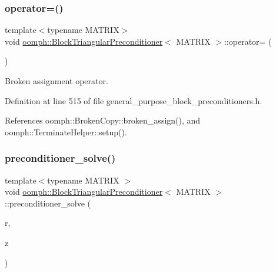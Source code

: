 \subsubsection{\texorpdfstring{operator=()}{operator=()}}
{\footnotesize\ttfamily template$<$typename M\+A\+T\+R\+IX$>$ \\
void \hyperlink{classoomph_1_1BlockTriangularPreconditioner}{oomph\+::\+Block\+Triangular\+Preconditioner}$<$ M\+A\+T\+R\+IX $>$\+::operator= (\begin{DoxyParamCaption}\item[{const \hyperlink{classoomph_1_1BlockTriangularPreconditioner}{Block\+Triangular\+Preconditioner}$<$ M\+A\+T\+R\+IX $>$ \&}]{ }\end{DoxyParamCaption})\hspace{0.3cm}{\ttfamily [inline]}}



Broken assignment operator. 



Definition at line 515 of file general\+\_\+purpose\+\_\+block\+\_\+preconditioners.\+h.



References oomph\+::\+Broken\+Copy\+::broken\+\_\+assign(), and oomph\+::\+Terminate\+Helper\+::setup().

\mbox{\label{classoomph_1_1BlockTriangularPreconditioner_aede879082caa04a2de50c811ee6d7f5b}} 
\subsubsection{\texorpdfstring{preconditioner\+\_\+solve()}{preconditioner\_solve()}}
{\footnotesize\ttfamily template$<$typename M\+A\+T\+R\+IX $>$ \\
void \hyperlink{classoomph_1_1BlockTriangularPreconditioner}{oomph\+::\+Block\+Triangular\+Preconditioner}$<$ M\+A\+T\+R\+IX $>$\+::preconditioner\+\_\+solve (\begin{DoxyParamCaption}\item[{const \hyperlink{classoomph_1_1DoubleVector}{Double\+Vector} \&}]{r,  }\item[{\hyperlink{classoomph_1_1DoubleVector}{Double\+Vector} \&}]{z }\end{DoxyParamCaption})\hspace{0.3cm}{\ttfamily [virtual]}}



